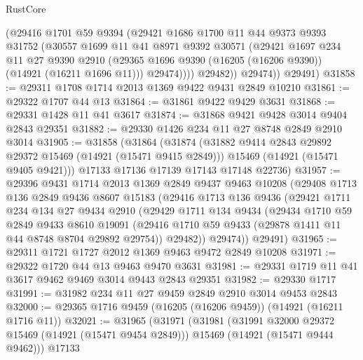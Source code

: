 \begin{lexlean}{RustCore}
\begin{coremodule}
              (@29416
                @1701
                @59
                @9394
                (@29421
                  @1686
                  @1700
                  @11
                  @44
                  @9373
                  @9393
                  @31752
                  (@30557
                    @1699
                    @11
                    @41
                    @8971
                    @9392
                    @30571
                    (@29421
                      @1697
                      @234
                      @11
                      @27
                      @9390
                      @2910
                      (@29365 @1696 @9390 (@16205 (@16206 @9390)) (@14921 (@16211 @1696 @11)))
                      @29474))))
              @29482))
          @29474))
      @29491)
@31858 := @29311 @1708 @1714 @2013 @1369 @9422 @9431 @2849 @10210
@31861 := @29322 @1707 @44 @13
@31864 := @31861 @9422 @9429 @3631
@31868 := @29331 @1428 @11 @41 @3617
@31874 := @31868 @9421 @9428 @3014 @9404 @2843 @29351
@31882 := @29330 @1426 @234 @11 @27 @8748 @2849 @2910 @3014
@31905 := @31858
    (@31864
      (@31874
        (@31882 @9414 @2843 @29892 @29372 @15469 (@14921 (@15471 @9415 @2849)))
        @15469
        (@14921 (@15471 @9405 @9421)))
      @17133
      @17136
      @17139
      @17143
      @17148
      @22736)
@31957 := @29396
    @9431
    @1714
    @2013
    @1369
    @2849
    @9437
    @9463
    @10208
    (@29408
      @1713
      @136
      @2849
      @9436
      @8607
      @15183
      (@29416
        @1713
        @136
        @9436
        (@29421
          @1711
          @234
          @134
          @27
          @9434
          @2910
          (@29429
            @1711
            @134
            @9434
            (@29434
              @1710
              @59
              @2849
              @9433
              @8610
              @19091
              (@29416 @1710 @59 @9433 (@29878 @1411 @11 @44 @8748 @8704 @29892 @29754))
              @29482))
          @29474))
      @29491)
@31965 := @29311 @1721 @1727 @2012 @1369 @9463 @9472 @2849 @10208
@31971 := @29322 @1720 @44 @13 @9463 @9470 @3631
@31981 := @29331 @1719 @11 @41 @3617 @9462 @9469 @3014 @9443 @2843 @29351
@31982 := @29330 @1717
@31991 := @31982 @234 @11 @27 @9459 @2849 @2910 @3014 @9453 @2843
@32000 := @29365 @1716 @9459 (@16205 (@16206 @9459)) (@14921 (@16211 @1716 @11))
@32021 := @31965
    (@31971
      (@31981
        (@31991 @32000 @29372 @15469 (@14921 (@15471 @9454 @2849)))
        @15469
        (@14921 (@15471 @9444 @9462)))
      @17133

\end{coremodule}
\end{lexlean}

